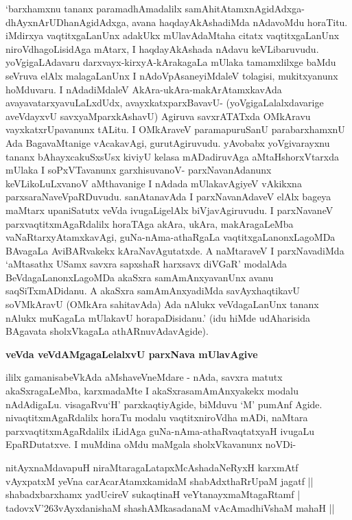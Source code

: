 `barxhamxnu tananx paramadhAmadalilx samAhitAtamxnAgidAdxga- dhAyxnArUDhanAgidAdxga, avana haqdayAkAshadiMda nAdavoMdu horaTitu. iMdirxya vaqtitxgaLanUnx adakUkx mUlavAdaMtaha citatx vaqtitxgaLanUnx niroVdhagoLisidAga mAtarx, I haqdayAkAshada nAdavu keVLibaruvudu. yoVgigaLAdavaru darxvayx-kirxyA-kArakagaLa mUlaka tamamxlilxge baMdu seVruva elAlx malagaLanUnx I nAdoVpAsaneyiMdaleV tolagisi, mukitxyanunx hoMduvaru. I nAdadiMdaleV AkAra-ukAra-makArAtamxkavAda avayavatarxyavuLaLxdUdx, avayxkatxparxBavavU- (yoVgigaLalalxdavarige aveVdayxvU savxyaMparxkAshavU) Agiruva savxrATATxda OMkAravu vayxkatxrUpavanunx tALitu. I OMkAraveV paramapuruSanU parabarxhamxnU Ada BagavaMtanige vAcakavAgi, gurutAgiruvudu. yAvobabx yoVgivarayxnu tananx bAhayxcakuSxsUsx kiviyU kelasa mADadiruvAga aMtaHshorxVtarxda mUlaka I soPxVTavanunx garxhisuvanoV- parxNavanAdanunx keVLikoLuLxvanoV aMthavanige I nAdada mUlakavAgiyeV vAkikxna parxsaraNaveVpaRDuvudu. sanAtanavAda I parxNavanAdaveV elAlx bageya maMtarx upaniSatutx veVda ivugaLigelAlx biVjavAgiruvudu. I parxNavaneV parxvaqtitxmAgaRdalilx horaTAga akAra, ukAra, makAragaLeMba vaNaRtarxyAtamxkavAgi, guNa-nAma-athaRgaLa vaqtitxgaLanonxLagoMDa BAvagaLa AviBARvakekx kAraNavAgutatxde. A naMtaraveV I parxNavadiMda `aMtasathx USamx savxra sapxshaR harxsavx diVGaR' modalAda BeVdagaLanonxLagoMDa akaSxra samAmAnxyavanUnx avanu saqSiTxmADidanu. A akaSxra samAmAnxyadiMda savAyxhaqtikavU soVMkAravU (OMkAra sahitavAda) Ada nAlukx veVdagaLanUnx tananx nAlukx muKagaLa mUlakavU horapaDisidanu.' (idu hiMde udAharisida BAgavata sholxVkagaLa athARnuvAdavAgide).

\noindent
{\bf\large{veVda veVdAMgagaLelalxvU parxNava mUlavAgive}}\label{165}

ililx gamanisabeVkAda aMshaveVneMdare - nAda, savxra matutx akaSxragaLeMba, karxmadaMte I akaSxrasamAmAnxyakekx modalu nAdAdigaLu. visagaRvu`H' parxkaqtiyAgide, biMduvu `M' pumAnf Agide. nivaqtitxmAgaRdalilx horaTu modalu vaqtitxniroVdha mADi, naMtara parxvaqtitxmAgaRdalilx iLidAga guNa-nAma-athaRvaqtatxyaH ivugaLu EpaRDutatxve. I muMdina oMdu maMgala sholxVkavanunx noVDi-

\begin{shloka}
nitAyxnaMdavapuH niraMtaragaLatapxMcAshadaNeRyxH karxmAtf\\\label{165}
vAyxpatxM yeVna carAcarAtamxkamidaM shabAdxthaRrUpaM jagatf ||\\
shabadxbarxhamx yadUcireV sukaqtinaH veYtanayxmaMtagaRtamf |\\
tadovxV\char'263vAyxdanishaM shashAMkasadanaM vAcAmadhiVshaM mahaH ||
\end{shloka}

